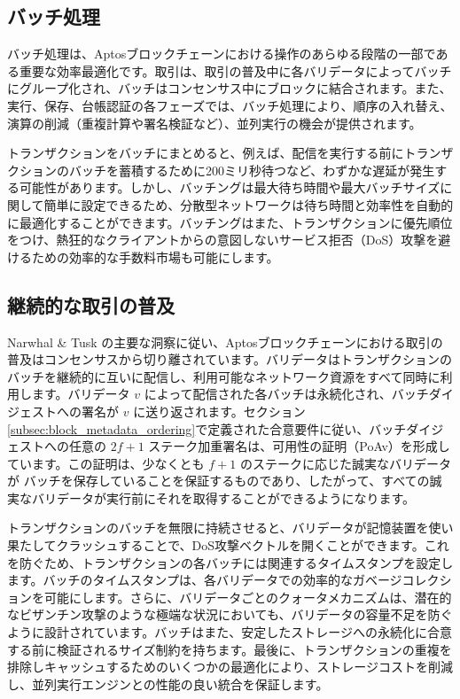 \documentclass{article}
\begin{document}
\subsection{バッチ処理}
\label{sub:batch_processing}

バッチ処理は、Aptosブロックチェーンにおける操作のあらゆる段階の一部である重要な効率最適化です。取引は、取引の普及中に各バリデータによってバッチにグループ化され、バッチはコンセンサス中にブロックに結合されます。また、実行、保存、台帳認証の各フェーズでは、バッチ処理により、順序の入れ替え、演算の削減（重複計算や署名検証など）、並列実行の機会が提供されます。

トランザクションをバッチにまとめると、例えば、配信を実行する前にトランザクションのバッチを蓄積するために200ミリ秒待つなど、わずかな遅延が発生する可能性があります。しかし、バッチングは最大待ち時間や最大バッチサイズに関して簡単に設定できるため、分散型ネットワークは待ち時間と効率性を自動的に最適化することができます。バッチングはまた、トランザクションに優先順位をつけ、熱狂的なクライアントからの意図しないサービス拒否（DoS）攻撃を避けるための効率的な手数料市場も可能にします。

\subsection{継続的な取引の普及}
\label{continuous_txn_dissemination}

Narwhal \& Tusk \cite{narwhal_tusk}の主要な洞察に従い、Aptosブロックチェーンにおける取引の普及はコンセンサスから切り離されています。バリデータはトランザクションのバッチを継続的に互いに配信し、利用可能なネットワーク資源をすべて同時に利用します。バリデータ $v$ によって配信された各バッチは永続化され、バッチダイジェストへの署名が $v$ に送り返されます。セクション \ref{subsec:block_metadata_ordering}で定義された合意要件に従い、バッチダイジェストへの任意の $2f+1$ ステーク加重署名は、可用性の証明（PoAv）を形成しています。この証明は、少なくとも $f+1$ のステークに応じた誠実なバリデータが バッチを保存していることを保証するものであり、したがって、すべての誠実なバリデータが実行前にそれを取得することができるようになります。

トランザクションのバッチを無限に持続させると、バリデータが記憶装置を使い果たしてクラッシュすることで、DoS攻撃ベクトルを開くことができます。これを防ぐため、トランザクションの各バッチには関連するタイムスタンプを設定します。バッチのタイムスタンプは、各バリデータでの効率的なガベージコレクションを可能にします。さらに、バリデータごとのクォータメカニズムは、潜在的なビザンチン攻撃のような極端な状況においても、バリデータの容量不足を防ぐように設計されています。バッチはまた、安定したストレージへの永続化に合意する前に検証されるサイズ制約を持ちます。最後に、トランザクションの重複を排除しキャッシュするためのいくつかの最適化により、ストレージコストを削減し、並列実行エンジンとの性能の良い統合を保証します。
\end{document}
